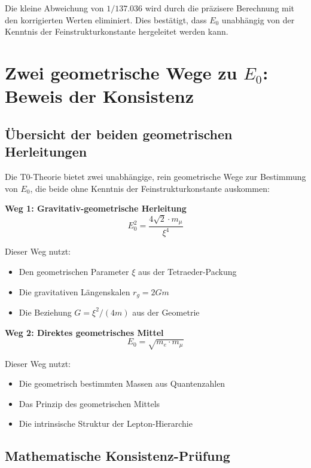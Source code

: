 	Die kleine Abweichung von $1/137.036$ wird durch die präzisere Berechnung mit den korrigierten Werten eliminiert. Dies bestätigt, dass $E_0$ unabhängig von der Kenntnis der Feinstrukturkonstante hergeleitet werden kann.
	
	\section{Zwei geometrische Wege zu $E_0$: Beweis der Konsistenz}
	
	\subsection{Übersicht der beiden geometrischen Herleitungen}
	
	Die T0-Theorie bietet zwei unabhängige, rein geometrische Wege zur Bestimmung von $E_0$, die beide ohne Kenntnis der Feinstrukturkonstante auskommen:
	
	\textbf{Weg 1: Gravitativ-geometrische Herleitung}
	\begin{equation}
		E_0^2 = \frac{4\sqrt{2} \cdot m_\mu}{\xi^4}
	\end{equation}
	
	Dieser Weg nutzt:
	\begin{itemize}
		\item Den geometrischen Parameter $\xi$ aus der Tetraeder-Packung
		\item Die gravitativen Längenskalen $r_g = 2Gm$
		\item Die Beziehung $G = \xi^2/(4m)$ aus der Geometrie
	\end{itemize}
	
	\textbf{Weg 2: Direktes geometrisches Mittel}
	\begin{equation}
		E_0 = \sqrt{m_e \cdot m_\mu}
	\end{equation}
	
	Dieser Weg nutzt:
	\begin{itemize}
		\item Die geometrisch bestimmten Massen aus Quantenzahlen
		\item Das Prinzip des geometrischen Mittels
		\item Die intrinsische Struktur der Lepton-Hierarchie
	\end{itemize}
	
	\subsection{Mathematische Konsistenz-Prüfung}
	
